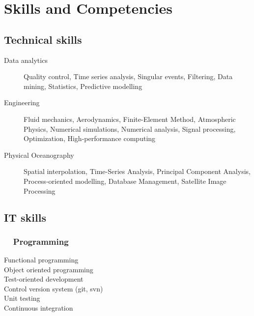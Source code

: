 \documentclass[11pt,a4paper,svgnames]{article}
\newcommand*\circled[1]{\tikz[baseline=(char.base)]{\node[shape=circle,draw,inner sep=2pt] (char) {#1};}}
\begin{document}
\newpage

\section{Skills and Competencies}

\subsection{Technical skills}

\begin{description}

\item[Data analytics] Quality control, Time series analysis, Singular events, Filtering, Data mining, Statistics, Predictive modelling

\item[Engineering] Fluid mechanics, Aerodynamics, Finite-Element Method, Atmospheric Physics, Numerical simulations, Numerical analysis, Signal processing, Optimization, High-performance computing

\item[Physical Oceanography] Spatial interpolation, Time-Series Analysis, Principal Component Analysis, Process-oriented modelling, Database Management, Satellite Image Processing

\end{description}


\subsection{IT skills}

\subsubsection*{\circled{\faCode}~~Programming}
Functional programming 				\\ 
Object oriented programming		\\
Test-oriented development			\\
Control version system (git, svn)	\\
Unit testing						\\	
Continuous integration
\end{document}
